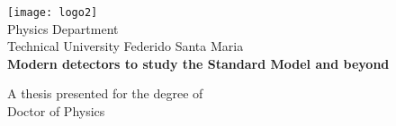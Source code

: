 \begin{titlepage}
	\begin{center}
		\vspace*{1cm}

		\texttt{[image: logo2]}\\
		\Large
		Physics Department \\
		Technical University Federido Santa Maria \\
		\vspace{4.5cm}
		\Huge
		{\bf Modern detectors to study the Standard Model and beyond}
		

		\vspace{1.5cm}

		\vfill

		A thesis presented for the degree of\\
		Doctor of Physics



		\end{center}
\end{titlepage}


